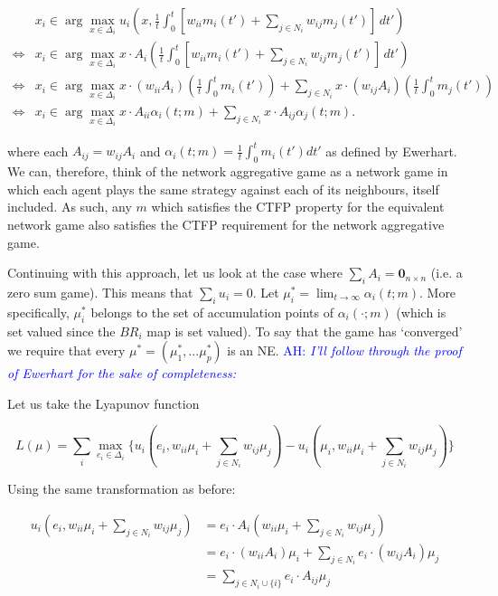 \documentclass{article}
\theoremstyle{definition}
\newcommand{\ah}[1]{\textcolor{blue}{AH: \textit{#1}}}
\begin{document}
	\begin{align}
		& x_i \in \arg\max_{x \in \Delta_i} u_i(x,\frac{1}{t} \int_{0}^{t} [w_{ii} m_i(t') + \sum_{j \in N_i} w_{ij} m_j(t')] \, dt') \nonumber \\
		\iff & x_i \in \arg\max_{x \in \Delta_i} x \cdot A_i \left(\frac{1}{t} \int_{0}^{t} [w_{ii} m_i(t') + \sum_{j \in N_i} w_{ij} m_j(t')] \, dt' \right) \nonumber \\
		\iff & x_i \in \arg \max_{x \in \Delta_i} x \cdot (w_{ii} A_i) \left( \frac{1}{t} \int_{0}^{t} m_i(t')\right) + \sum_{j \in N_i} x \cdot (w_{ij} A_i) \left( \frac{1}{t} \int_{0}^{t} m_j(t')\right) \nonumber \\
		\iff & x_i \in \arg \max_{x \in \Delta_i} x \cdot A_{ii} \alpha_i(t; m) + \sum_{j \in N_i} x \cdot A_{ij} \alpha_j(t; m).
	\end{align}
	
	where each $A_{ij} = w_{ij} A_i$ and $\alpha_i(t; m) =\frac{1}{t} \int_{0}^{t} m_i(t') dt'$ as defined by Ewerhart. We can, therefore, think of the network aggregative game as a network game in which each agent plays the same strategy against each of its neighbours, itself included. As such, any $m$ which satisfies the CTFP property for the equivalent network game also satisfies the CTFP requirement for the network aggregative game. 
	
	Continuing with this approach, let us look at the case where $\sum_i A_i = \textbf{0}_{n\times n}$ (i.e. a zero sum game). This means that $\sum_i u_i = 0$. Let $\mu_i^* = \lim_{t \rightarrow \infty} \alpha_i(t; m)$. More specifically, $\mu_i^*$ belongs to the set of accumulation points of $\alpha_i(\cdot; m)$ (which is set valued since the $BR_i$ map is set valued). To say that the game has `converged' we require that every $\mu^* = (\mu_1^*, ... \mu_p^*)$ is an NE. \ah{I'll follow through the proof of Ewerhart for the sake of completeness: }
	
	Let us take the Lyapunov function
	
	\begin{equation}
		L(\mu) = \sum_i \max_{e_i \in \Delta_i} \{u_i(e_i, w_{ii} \mu_i + \sum_{j \in N_i} w_{ij} \mu_j) - u_i(\mu_i, w_{ii} \mu_i + \sum_{j \in N_i} w_{ij} \mu_j) \}
	\end{equation}
	
	Using the same transformation as before:
	
	\begin{align}
		 u_i(e_i, w_{ii} \mu_i + \sum_{j \in N_i} w_{ij} \mu_j) & =  e_i \cdot A_i (w_{ii} \mu_i + \sum_{j \in N_i} w_{ij} \mu_j) \nonumber \\
		 & =  e_i \cdot (w_{ii} A_i) \mu_i + \sum_{j \in N_i} e_i \cdot (w_{ij} A_i) \mu_j \nonumber \\
		  & =  \sum_{j \in N_i \cup \{i\}} e_i \cdot A_{ij} \mu_j \nonumber 
	\end{align}
	
\end{document}
